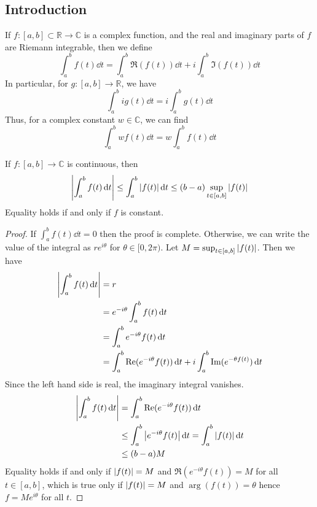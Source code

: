 \subsection{Introduction}
\begin{definition}
	If \( f \colon [a,b] \subset \mathbb R \to \mathbb C \) is a complex function, and the real and imaginary parts of \( f \) are Riemann integrable, then we define
	\[ \int_a^b f(t) \dd{t} = \int_a^b \Re(f(t)) \dd{t} + i \int_a^b \Im(f(t)) \dd{t} \]
	In particular, for \( g \colon [a,b] \to \mathbb R \), we have
	\[ \int_a^b ig(t) \dd{t} = i\int_a^b g(t) \dd{t} \]
	Thus, for a complex constant \( w \in \mathbb C \), we can find
	\[ \int_a^b wf(t) \dd{t} = w \int_a^b f(t) \dd{t} \]
\end{definition}
\begin{proposition}
	If \( f \colon [a,b] \to \mathbb C \) is continuous, then
	\[ \abs{\int_a^b f(t) \dd{t}} \leq \int_a^b \abs{f(t)} \dd{t} \leq (b-a) \sup_{t \in [a,b]} \abs{f(t)} \]
	Equality holds if and only if \( f \) is constant.
\end{proposition}
\begin{proof}
	If \( \int_a^b f(t) \dd{t} = 0 \) then the proof is complete.
	Otherwise, we can write the value of the integral as \( re^{i\theta} \) for \( \theta \in [0, 2\pi) \).
	Let \( M = \sup_{t \in [a,b]} \abs{f(t)} \).
	Then we have
	\begin{align*}
		\abs{\int_a^b f(t) \dd{t}} &= r \\
		&= e^{-i\theta} \int_a^b f(t) \dd{t} \\
		&= \int_a^b e^{-i\theta} f(t) \dd{t} \\
		&= \int_a^b \Re(e^{-i\theta} f(t)) \dd{t} + i \int_a^b \Im(e^{-\theta f(t)}) \dd{t}
	\end{align*}
	Since the left hand side is real, the imaginary integral vanishes.
	\begin{align*}
		\abs{\int_a^b f(t) \dd{t}} &= \int_a^b \Re(e^{-i\theta} f(t)) \dd{t} \\
		&\leq \int_a^b \abs{e^{-i\theta} f(t)} \dd{t} = \int_a^b \abs{f(t)} \dd{t} \\
		&\leq (b-a)M
	\end{align*}
	Equality holds if and only if \( \abs{f(t)} = M \) and \( \Re(e^{-i\theta} f(t)) = M \) for all \( t \in [a,b] \), which is true only if \( \abs{f(t)} = M \) and \( \arg(f(t)) = \theta \) hence \( f = Me^{i\theta} \) for all \( t \).
\end{proof}


